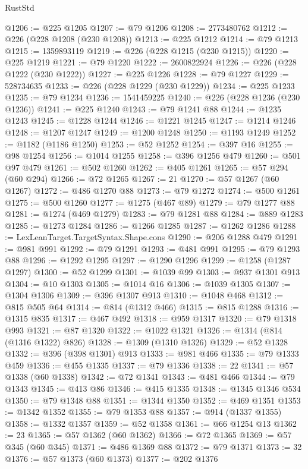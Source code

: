 \begin{lexlean}{RustStd}
\begin{coremodule}
@1206 := @225 @1205
@1207 := @79 @1206
@1208 := 2773480762
@1212 := @226 (@228 @1208 (@230 @1208))
@1213 := @225 @1212
@1214 := @79 @1213
@1215 := 1359893119
@1219 := @226 (@228 @1215 (@230 @1215))
@1220 := @225 @1219
@1221 := @79 @1220
@1222 := 2600822924
@1226 := @226 (@228 @1222 (@230 @1222))
@1227 := @225 @1226
@1228 := @79 @1227
@1229 := 528734635
@1233 := @226 (@228 @1229 (@230 @1229))
@1234 := @225 @1233
@1235 := @79 @1234
@1236 := 1541459225
@1240 := @226 (@228 @1236 (@230 @1236))
@1241 := @225 @1240
@1243 := @79 @1241 @88
@1244 := @1235 @1243
@1245 := @1228 @1244
@1246 := @1221 @1245
@1247 := @1214 @1246
@1248 := @1207 @1247
@1249 := @1200 @1248
@1250 := @1193 @1249
@1252 := @1182 (@1186 @1250)
@1253 := @52 @1252
@1254 := @397 @16
@1255 := @98 @1254
@1256 := @1014 @1255
@1258 := @396 @1256 @479
@1260 := @501 @97 @479
@1261 := @502 @1260
@1262 := @405 @1261
@1265 := @57 @294 (@60 @294)
@1266 := @72 @1265
@1267 := 21
@1270 := @57 @1267 (@60 @1267)
@1272 := @486 @1270 @88
@1273 := @79 @1272
@1274 := @500 @1261
@1275 := @500 @1260
@1277 := @1275 (@467 @89)
@1279 := @79 @1277 @88
@1281 := @1274 (@469 @1279)
@1283 := @79 @1281 @88
@1284 := @889 @1283
@1285 := @1273 @1284
@1286 := @1266 @1285
@1287 := @1262 @1286
@1288 := LexLeanTarget.TargetSyntax.Shape.cons
@1290 := @206 @1288 @479
@1291 := @981 @991
@1292 := @79 @1291
@1293 := @481 @991
@1295 := @79 @1293 @88
@1296 := @1292 @1295
@1297 := @1290 @1296
@1299 := @1258 (@1287 @1297)
@1300 := @52 @1299
@1301 := @1039 @99
@1303 := @937 @1301 @913
@1304 := @10 @1303
@1305 := @1014 @16
@1306 := @1039 @1305
@1307 := @1304 @1306
@1309 := @396 @1307 @913
@1310 := @1048 @468
@1312 := @815 @505 @64
@1314 := @814 (@1312 @466)
@1315 := @815 @1288
@1316 := @1315 @835
@1317 := @467 @492
@1318 := @959 @1317
@1320 := @79 @1318 @993
@1321 := @87 @1320
@1322 := @1022 @1321
@1326 := @1314 (@814 (@1316 @1322) @826)
@1328 := @1309 (@1310 @1326)
@1329 := @52 @1328
@1332 := @396 (@398 @1301) @913
@1333 := @981 @466
@1335 := @79 @1333 @459
@1336 := @455 @1335
@1337 := @79 @1336
@1338 := 22
@1341 := @57 @1338 (@60 @1338)
@1342 := @72 @1341
@1343 := @481 @466
@1344 := @79 @1343
@1345 := @413 @86
@1346 := @415 @1335
@1348 := @1345 @1346 @534
@1350 := @79 @1348 @88
@1351 := @1344 @1350
@1352 := @469 @1351
@1353 := @1342 @1352
@1355 := @79 @1353 @88
@1357 := @914 (@1337 @1355)
@1358 := @1332 @1357
@1359 := @52 @1358
@1361 := @66 @1254 @13
@1362 := 23
@1365 := @57 @1362 (@60 @1362)
@1366 := @72 @1365
@1369 := @57 @345 (@60 @345)
@1371 := @486 @1369 @88
@1372 := @79 @1371
@1373 := 32
@1376 := @57 @1373 (@60 @1373)
@1377 := @202 @1376

\end{coremodule}
\end{lexlean}
